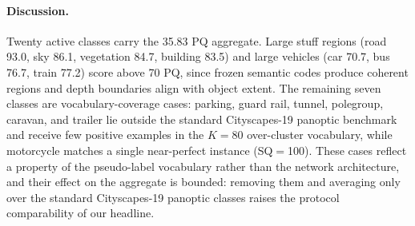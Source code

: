 \documentclass{article}
\begin{document}
\begin{table}[H]
\caption{Per-class Cityscapes validation metrics for the final trained network. Values are percentages. Six classes (parking, guard rail, tunnel, polegroup, caravan, trailer) are vocabulary-dead; the twenty active classes carry the 35.83 PQ aggregate reported in the main paper.}
\label{tab:perclass}
\centering
\small
\setlength{\tabcolsep}{6pt}
\end{table}

\paragraph{Discussion.}
Twenty active classes carry the 35.83 PQ aggregate. Large stuff regions (road 93.0, sky 86.1, vegetation 84.7, building 83.5) and large vehicles (car 70.7, bus 76.7, train 77.2) score above 70 PQ, since frozen semantic codes produce coherent regions and depth boundaries align with object extent. The remaining seven classes are vocabulary-coverage cases: parking, guard rail, tunnel, polegroup, caravan, and trailer lie outside the standard Cityscapes-19 panoptic benchmark and receive few positive examples in the $K{=}80$ over-cluster vocabulary, while motorcycle matches a single near-perfect instance (SQ$=$100). These cases reflect a property of the pseudo-label vocabulary rather than the network architecture, and their effect on the aggregate is bounded: removing them and averaging only over the standard Cityscapes-19 panoptic classes raises the protocol comparability of our headline.
\end{document}
